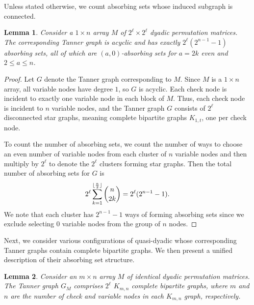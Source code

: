 \documentclass[11pt]{article}
\newtheorem{lemma}{Lemma}[section]
\theoremstyle{plain}
\theoremstyle{plain}
\theoremstyle{definition}
\numberwithin{theo}{section}
\newcounter{rom}
\begin{document}
Unless stated otherwise, we count absorbing sets whose induced subgraph is connected.

\begin{lemma}
Consider a $1 \times n$ array $M$ of $2^{\ell}\times 2^{\ell}$ dyadic permutation matrices. The corresponding Tanner graph is acyclic and has exactly $2^{\ell}(2^{n-1}-1)$ absorbing sets, all of which are $(a,0)$-absorbing sets for $a=2k$ even and $2 \leq a \leq n$.
\end{lemma} 

\begin{proof}
Let $G$ denote the Tanner graph corresponding to $M$. Since $M$ is a $1 \times n$ array, all variable nodes have degree $1$, so $G$ is acyclic. 
Each check node is incident to exactly one variable node in each block of $M$. 
Thus, each check node is incident to $n$ variable nodes, and the Tanner graph $G$ consists of $2^{\ell}$ disconnected star graphs, meaning complete bipartite graphs $K_{1,t}$, one per check node. 

To count the number of absorbing sets, we count the number of ways to choose an even number of variable nodes from each cluster of $n$ variable nodes and then multiply by $2^{\ell}$ to denote the $2^{\ell}$ clusters forming star graphs. Then the total number of absorbing sets for $G$ is 
\[
2^{\ell}\sum_{k=1}^{\lfloor \frac{n}{2} \rfloor} \binom{n}{2k} = 2^{\ell}(2^{n-1}-1).\\
\]
We note that each cluster has $2^{n-1}-1$ ways of forming absorbing sets since we exclude selecting $0$ variable nodes from the group of $n$ nodes. 
\end{proof}

Next, we consider various configurations of quasi-dyadic whose corresponding Tanner graphs contain complete bipartite graphs. We then present a unified description of their absorbing set structure. 

\begin{lemma}\label{absorbing_identical_blocks}
Consider an $m \times n$ array $M$ of identical dyadic permutation matrices. The Tanner graph $G_M$ comprises  $2^{\ell}$ $K_{m,n}$ complete bipartite graphs, where $m$ and $n$ are the number of check and variable nodes in each $K_{m,n}$ graph, respectively.
\end{lemma}
\end{document}
